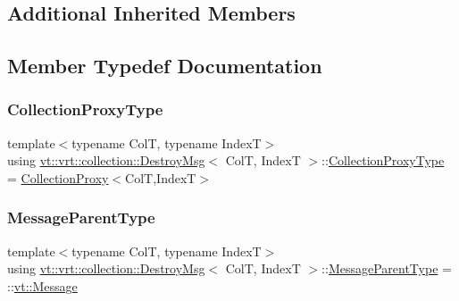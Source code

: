 \subsection*{Additional Inherited Members}


\subsection{Member Typedef Documentation}
\mbox{\label{structvt_1_1vrt_1_1collection_1_1_destroy_msg_a5bf089cacadf94e55e9ae797c4cd0462}} 
\subsubsection{\texorpdfstring{Collection\+Proxy\+Type}{CollectionProxyType}}
{\footnotesize\ttfamily template$<$typename ColT, typename IndexT$>$ \\
using \hyperlink{structvt_1_1vrt_1_1collection_1_1_destroy_msg}{vt\+::vrt\+::collection\+::\+Destroy\+Msg}$<$ ColT, IndexT $>$\+::\hyperlink{structvt_1_1vrt_1_1collection_1_1_destroy_msg_a5bf089cacadf94e55e9ae797c4cd0462}{Collection\+Proxy\+Type} =  \hyperlink{structvt_1_1vrt_1_1collection_1_1_collection_proxy}{Collection\+Proxy}$<$ColT,IndexT$>$}

\mbox{\label{structvt_1_1vrt_1_1collection_1_1_destroy_msg_a18f035465f85a59ba6aea71a3829b500}} 
\subsubsection{\texorpdfstring{Message\+Parent\+Type}{MessageParentType}}
{\footnotesize\ttfamily template$<$typename ColT, typename IndexT$>$ \\
using \hyperlink{structvt_1_1vrt_1_1collection_1_1_destroy_msg}{vt\+::vrt\+::collection\+::\+Destroy\+Msg}$<$ ColT, IndexT $>$\+::\hyperlink{structvt_1_1messaging_1_1_active_msg_ac2e6d93267991027ce78c968b17064c7}{Message\+Parent\+Type} =  \+::\hyperlink{namespacevt_a3a3ddfef40b4c90915fa43cdd5f129ea}{vt\+::\+Message}}



